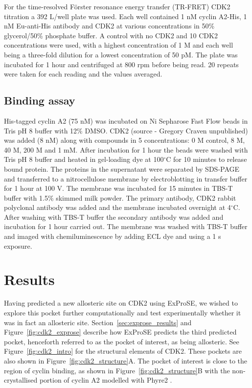 For the time-resolved F\"{o}rster resonance energy transfer (TR-FRET) CDK2 titration a 392 \textmu L/well plate was used.
Each well contained 1 nM cyclin A2-His, 1 nM Eu-anti-His antibody and CDK2 at various concentrations in 50\% glycerol/50\% phosphate buffer.
A control with no CDK2 and 10 CDK2 concentrations were used, with a highest concentration of 1 \textmu M and each well being a three-fold dilution for a lowest concentration of 50 pM.
The plate was incubated for 1 hour and centrifuged at 800 rpm before being read.
20 repeats were taken for each reading and the values averaged.


\subsection{Binding assay}

His-tagged cyclin A2 (75 nM) was incubated on Ni Sepharose Fast Flow beads in Tris pH 8 buffer with 12\% DMSO.
CDK2 (source - Gregory Craven unpublished) was added (8 nM) along with compounds in 5 concentrations: 0 M control, 8 \textmu M, 40 \textmu M, 200 \textmu M and 1 mM.
After incubation for 1 hour the beads were washed with Tris pH 8 buffer and heated in gel-loading dye at 100$^{\circ}$C for 10 minutes to release bound protein.
The proteins in the supernatant were separated by SDS-PAGE and transferred to a nitrocellulose membrane by electroblotting in transfer buffer for 1 hour at 100 V.
The membrane was incubated for 15 minutes in TBS-T buffer with 1.5\% skimmed milk powder.
The primary antibody, CDK2 rabbit polyclonal antibody was added and the membrane incubated overnight at 4$^{\circ}$C.
After washing with TBS-T buffer the secondary antibody was added and incubation for 1 hour carried out.
The membrane was washed with TBS-T buffer and imaged with chemiluminescence by adding ECL dye and using a 1 s exposure.


\section{Results}
\label{sec:cdk2_results}

Having predicted a new allosteric site on CDK2 using ExProSE, we wished to explore this pocket further computationally and test experimentally whether it was in fact an allosteric site.
Section~\ref{sec:exprose_results} and Figure~\ref{fig:cdk2_exprose} describe how ExProSE predicts the third predicted pocket, henceforth referred to as the pocket of interest, as being allosteric.
See Figure~\ref{fig:cdk2_intro} for the structural elements of CDK2.
These pockets are also shown in Figure~\ref{fig:cdk2_structure}A.
The pocket of interest is close to the region of cyclin binding, as shown in Figure~\ref{fig:cdk2_structure}B with the non-crystallised portion of cyclin A2 modelled with Phyre2 \cite{Kelley2015}.

